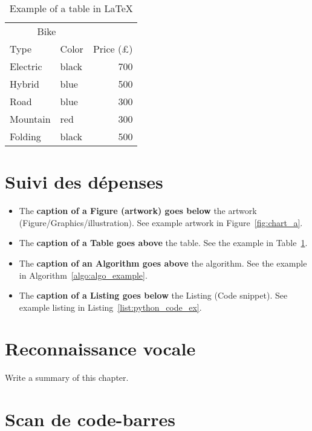 \begin{table}[h!]
    \centering
    \caption{Example of a table in \LaTeX}
    \label{tab:_ex_tab}
    \begin{tabular}{llr}     
        \toprule
        \multicolumn{2}{c}{Bike} \\
        \cmidrule(r){1-2}
        Type    &  Color & Price (\pounds) \\
        \midrule
        Electric    & black   & 700   \\
        Hybrid      & blue    & 500   \\
        Road        & blue    & 300   \\
        Mountain    & red     & 300   \\
        Folding     & black   & 500   \\
        \bottomrule
    \end{tabular}
\end{table}

\section{Suivi des dépenses}

\begin{itemize}
    \item The \textbf{caption of a Figure (artwork) goes below} the artwork (Figure/Graphics/illustration). See example artwork in Figure~\ref{fig:chart_a}. 
    \item  The \textbf{caption of a Table goes above} the table. See the example in Table~\ref{tab:_ex_tab}.
    \item  The \textbf{caption of an Algorithm goes above} the algorithm. See the example in Algorithm~\ref{algo:algo_example}.
    \item The \textbf{caption of a Listing goes below} the Listing  (Code snippet). See example listing in Listing~\ref{list:python_code_ex}. 
\end{itemize} 





\section{Reconnaissance vocale}
Write a summary of this chapter.



\section{Scan de code-barres}

